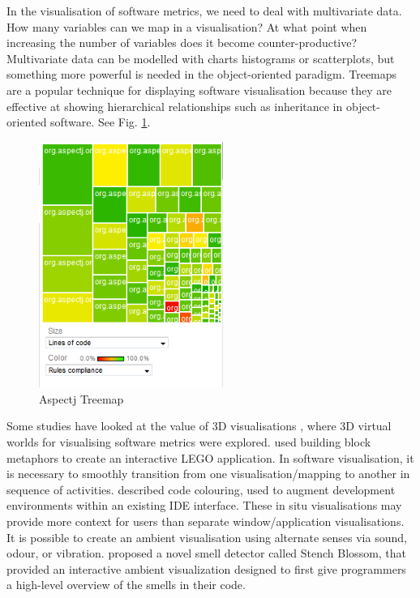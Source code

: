 In the visualisation of software metrics, we need to deal with multivariate data. How many variables can we map in a visualisation? At what point when increasing the number of variables does it become counter-productive? Multivariate data can be modelled with charts histograms or scatterplots, but something more powerful is needed in the object-oriented paradigm. Treemaps are a popular technique for displaying software visualisation because they are effective at showing hierarchical relationships such as inheritance in object-oriented software. See Fig. \ref{fig:treemap}.

\begin{figure} [h!]
  	 \centering
   	\includegraphics[width=60mm]{treemap.png}
  	\caption{Aspectj Treemap}
	\label{fig:treemap}
\end{figure}


Some studies have looked at the value of 3D visualisations \citep[such as][]{irwin03}, where 3D virtual worlds for visualising software metrics were explored. \citet{mendes11} used building block metaphors to create an interactive LEGO application. In software visualisation, it is necessary to smoothly transition from one visualisation/mapping to another in sequence of activities. \citet{harward10} described code colouring, used to augment development environments within an existing IDE interface. These in situ visualisations may provide more context for users than separate window/application visualisations. It is possible to create an ambient visualisation using alternate senses via sound, odour, or vibration. \citet{murphyhill10} proposed a novel smell detector called Stench Blossom, that provided an interactive ambient visualization designed to first give programmers a high-level overview of the smells in their code. %

